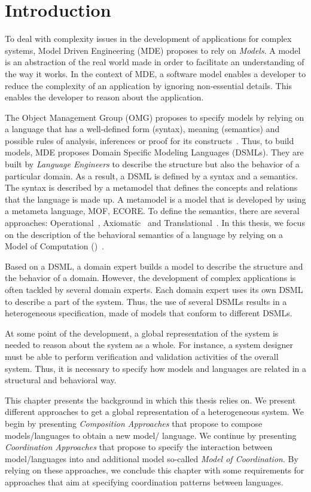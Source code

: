 \section{Introduction}
To deal with complexity issues in the development of applications for complex systems, Model Driven Engineering (MDE) proposes to rely on \emph{Models}. A model is an abstraction of the real world made in order to facilitate an understanding of the way it works. In the context of MDE, a software model enables a developer to reduce the complexity of an application by ignoring non-essential details. This enables the developer to reason about the application. 

The Object Management Group (OMG) proposes to specify models by relying on a language that has a well-defined form (syntax), meaning (semantics) and possible rules of analysis, inferences or proof for its constructs~\cite{mdaguide}. Thus, to build models, MDE proposes Domain Specific Modeling Languages (DSMLs). They are built by \emph{Language Engineers} to describe the structure but also the behavior of a particular domain. As a result, a DSML is defined by a syntax and a semantics. The syntax is described by a metamodel that defines the concepts and relations that the language is made up. A metamodel is a model that is developed by using a metameta language, \eg MOF, ECORE. To define the semantics, there are several approaches: Operational~\cite{operationbib}, Axiomatic~\cite{axiomaticbib} and Translational~\cite{translationalbib}. In this thesis, we focus on the description of the behavioral semantics of a language by relying on a Model of Computation (\mocc)~\cite{moccsemanticbib}. 

Based on a DSML, a domain expert builds a model to describe the structure and the behavior of a domain. However, the development of complex applications is often tackled by several domain experts. Each domain expert uses its own DSML to describe a part of the system. Thus, the use of several DSMLs results in a heterogeneous specification, \ie made of models that conform to different DSMLs. 

At some point of the development, a global representation of the system is needed to reason about the system as a whole. For instance, a system designer must be able to perform verification and validation activities of the overall system. Thus, it is necessary to specify how models and languages are related in a structural and behavioral way. 

This chapter presents the background in which this thesis relies on. We present different approaches to get a global representation of a heterogeneous system. We begin by presenting \emph{Composition Approaches} that propose to compose models/languages to obtain a new model/ language. We continue by presenting \emph{Coordination Approaches} that propose to specify the interaction between model/languages into and additional model so-called \emph{Model of Coordination}. By relying on these approaches, we conclude this chapter with some requirements for approaches that aim at specifying coordination patterns between languages.   


